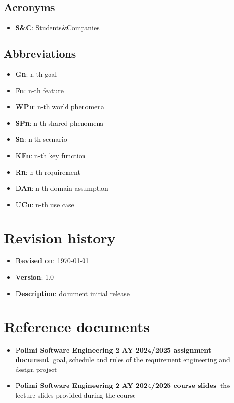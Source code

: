 \subsection{Acronyms}

\begin{itemize}
    \item \textbf{S\&C}: Students\&Companies
\end{itemize}

\subsection{Abbreviations}

\begin{itemize}
    \item \textbf{Gn}: n-th goal
    \item \textbf{Fn}: n-th feature
    \item \textbf{WPn}: n-th world phenomena
    \item \textbf{SPn}: n-th shared phenomena
    \item \textbf{Sn}: n-th scenario
    \item \textbf{KFn}: n-th key function
    \item \textbf{Rn}: n-th requirement
    \item \textbf{DAn}: n-th domain assumption
    \item \textbf{UCn}: n-th use case
\end{itemize}

\section{Revision history}

\begin{itemize}
    \item \textbf{Revised on}: \today
    \item \textbf{Version}: 1.0
    \item \textbf{Description}: document initial release
\end{itemize}

\section{Reference documents}

\begin{itemize}
    \item \textbf{Polimi Software Engineering 2 AY 2024/2025 assignment document}: goal, schedule and rules of the requirement engineering and design project
    \item \textbf{Polimi Software Engineering 2 AY 2024/2025 course slides}: the lecture slides provided during the course
\end{itemize}

